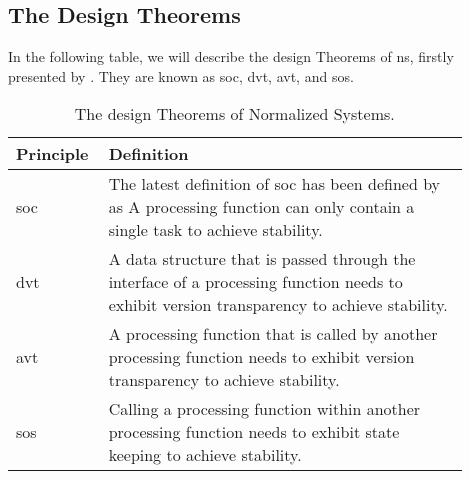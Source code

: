 \subsection{The Design Theorems} \label{subsec_ns_desing_theorems}

In the following table, we will describe the design Theorems of \gls{ns}, firstly presented
by \textcite[111-119]{mannaert_normalized_2009}. They are known as \gls{soc}, \gls{dvt},
\gls{avt}, and \gls{sos}.

\begin{table}[H]
    \begin{tabular}{ p{0.15\linewidth} p{0.75\linewidth}}
        \hline
        \textbf{Principle} & \textbf{Definition} \\ 
        \hline
        \acrshort*{soc} & The latest definition of \gls{soc} has been defined by
        \textcite[274]{mannaert_normalized_2016} as A processing function can only contain
        a single task to achieve stability. \\
        
        \acrshort{dvt} &  A data structure that is passed through the interface of a processing function needs to
        exhibit version transparency to achieve stability.\\
        
        \acrshort{avt} & A processing function that is called by another processing
        function needs to exhibit version transparency to achieve stability.\\
        
        \acrshort{sos} & Calling a processing function within another processing function needs to exhibit state
        keeping to achieve stability.\\
        
        \bottomrule
    \end{tabular}
    \caption{The design Theorems of Normalized Systems.}
    \label{ns_principles}
\end{table}